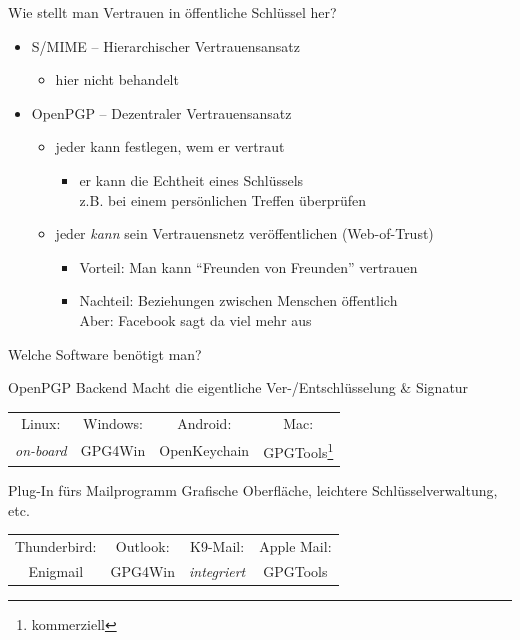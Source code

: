 \begin{frame}{Wie stellt man Vertrauen in öffentliche Schlüssel her?}
  \begin{itemize}
    \item S/MIME -- Hierarchischer Vertrauensansatz
    \begin{itemize}
      \item hier nicht behandelt
    \end{itemize}
    \item OpenPGP -- Dezentraler Vertrauensansatz
    \begin{itemize}
      \item jeder kann festlegen, wem er vertraut
      \begin{itemize}
        \item er kann die Echtheit eines Schlüssels\\ z.B. bei einem persönlichen Treffen überprüfen
      \end{itemize}
      \item jeder \emph{kann} sein Vertrauensnetz veröffentlichen (Web-of-Trust)
      \begin{itemize}
        \item Vorteil: Man kann ``Freunden von Freunden'' vertrauen
        \item Nachteil: Beziehungen zwischen Menschen öffentlich\\ Aber: Facebook sagt da viel mehr aus
      \end{itemize}
    \end{itemize}
  \end{itemize}
\end{frame}

\begin{frame}{Welche Software benötigt man?}
  \begin{block}{OpenPGP Backend}
    Macht die eigentliche Ver-/Entschlüsselung \& Signatur

    \vspace{1ex}
    \begin{tabular}{cccc}
      Linux:            & Windows: & Android:     & Mac:\\
      \textit{on-board} & GPG4Win  & OpenKeychain & GPGTools\footnote{kommerziell}\\
    \end{tabular}
  \end{block}
  \begin{block}{Plug-In fürs Mailprogramm}
    Grafische Oberfläche, leichtere Schlüsselverwaltung, etc.

    \vspace{1ex}
    \begin{tabular}{cccc}
      Thunderbird: & Outlook: & K9-Mail:            & Apple Mail:\\
      Enigmail     & GPG4Win  & \textit{integriert} & GPGTools\\
    \end{tabular}
  \end{block}
\end{frame}

\endinput
